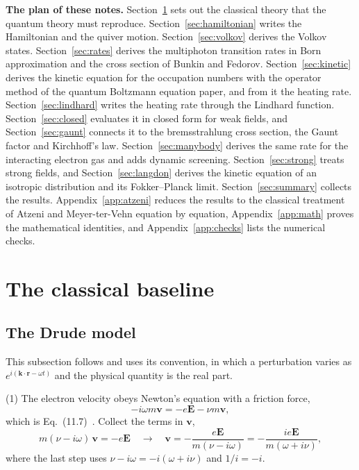 \documentclass[11pt]{article}
\numberwithin{equation}{section}
\newcommand{\kv}{\mathbf k}
\newcommand{\rv}{\mathbf r}
\newcommand{\vv}{\mathbf v}
\newcommand{\Ev}{\mathbf E}
\begin{document}
\noindent\textbf{The plan of these notes.} Section~\ref{sec:classical} sets out
the classical theory that the quantum theory must reproduce.
Section~\ref{sec:hamiltonian} writes the Hamiltonian and the quiver motion.
Section~\ref{sec:volkov} derives the Volkov states. Section~\ref{sec:rates}
derives the multiphoton transition rates in Born approximation and the cross
section of Bunkin and Fedorov. Section~\ref{sec:kinetic} derives the kinetic
equation for the occupation numbers with the operator method of the quantum
Boltzmann equation paper, and from it the heating rate.
Section~\ref{sec:lindhard} writes the heating rate through the Lindhard
function. Section~\ref{sec:closed} evaluates it in closed form for weak fields,
and Section~\ref{sec:gaunt} connects it to the bremsstrahlung cross section,
the Gaunt factor and Kirchhoff's law. Section~\ref{sec:manybody} derives the
same rate for the interacting electron gas and adds dynamic screening.
Section~\ref{sec:strong} treats strong fields, and
Section~\ref{sec:langdon} derives the kinetic equation of an isotropic
distribution and its Fokker--Planck limit. Section~\ref{sec:summary} collects
the results. Appendix~\ref{app:atzeni} reduces the results to the classical
treatment of Atzeni and Meyer-ter-Vehn equation by equation,
Appendix~\ref{app:math} proves the mathematical identities, and
Appendix~\ref{app:checks} lists the numerical checks.


\section{The classical baseline}
\label{sec:classical}
\subsection{The Drude model}
\label{sec:drude}
This subsection follows \cite[Sec.~11.1.1]{Atzeni2004} and uses its
convention, in which a perturbation varies as $e^{i(\kv\cdot\rv-\omega t)}$ and
the physical quantity is the real part.

{\noindent}(1) The electron velocity obeys Newton's equation with a friction
force,
\begin{equation}
-i\omega m\vv=-e\Ev-\nu m\vv,
\label{eq:drude-newton}
\end{equation}
which is Eq.~(11.7)~\cite{Atzeni2004}. Collect the terms in $\vv$,
\begin{equation}
m(\nu-i\omega)\,\vv=-e\Ev
\quad\longrightarrow\quad
\vv=-\frac{e\Ev}{m(\nu-i\omega)}=-\frac{ie\Ev}{m(\omega+i\nu)},
\end{equation}
where the last step uses $\nu-i\omega=-i(\omega+i\nu)$ and $1/i=-i$.
\end{document}
